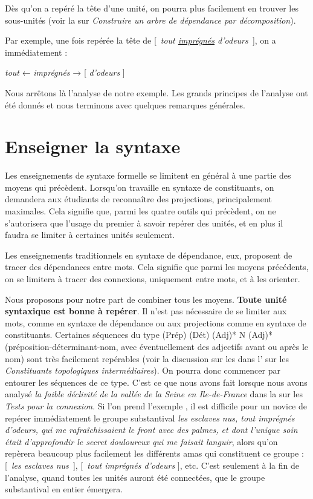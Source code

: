 \begin{tblsframed}{}
\noindent Dès qu’on a repéré la tête d’une unité, on pourra plus facilement en trouver les sous-unités (voir la  sur \textit{Construire un arbre de dépendance par décomposition}).
\end{tblsframed}

Par exemple, une fois repérée la tête de [~\textit{tout \uline{imprégnés} d’odeurs~}], on a immédiatement :

\ea
{\textit{tout}} ← \textit{imprégnés} → [ \textit{d’odeurs} ]
\z

Nous arrêtons là l’analyse de notre exemple. Les grands principes de l’analyse ont été donnés et nous terminons avec quelques remarques générales.

\section{Enseigner la syntaxe}\label{sec:3.4.28}

Les enseignements de syntaxe formelle se limitent en général à une partie des moyens qui précèdent. Lorsqu’on travaille en syntaxe de constituants, on demandera aux étudiants de reconnaître des projections, principalement maximales. Cela signifie que, parmi les quatre outils qui précèdent, on ne s’autorisera que l’usage du premier à savoir repérer des unités, et en plus il faudra se limiter à certaines unités seulement.

Les enseignements traditionnels en syntaxe de dépendance, eux, proposent de tracer des dépendances entre mots. Cela signifie que parmi les moyens précédents, on se limitera à tracer des connexions, uniquement entre mots, et à les orienter.

Nous proposons pour notre part de combiner tous les moyens. \textbf{Toute unité syntaxique est bonne à repérer}. Il n’est pas nécessaire de se limiter aux mots, comme en syntaxe de dépendance ou aux projections comme en syntaxe de constituants. Certaines séquences du type (Prép) (Dét) (Adj)* N (Adj)* (préposition-déterminant-nom, avec éventuellement des adjectifs avant ou après le nom) sont très facilement repérables (voir la discussion sur les  dans l' sur les \textit{Constituants topologiques intermédiaires}). On pourra donc commencer par entourer les séquences de ce type. C’est ce que nous avons fait lorsque nous avons analysé \textit{la faible déclivité de la vallée de la Seine en Ile-de-France} dans la  sur les \textit{Tests pour la connexion}. Si l’on prend l'exemple , il est difficile pour un novice de repérer immédiatement le groupe substantival \textit{les esclaves nus, tout imprégnés d’odeurs, qui me rafraîchissaient le front avec des palmes, et dont l’unique soin était d’approfondir le secret douloureux qui me faisait languir}, alors qu’on repèrera beaucoup plus facilement les différents amas qui constituent ce groupe : [~\textit{les esclaves nus~}], [~\textit{tout imprégnés d’odeurs} ], etc. C’est seulement à la fin de l’analyse, quand toutes les unités auront été connectées, que le groupe substantival en entier émergera.

